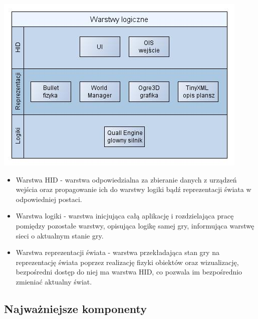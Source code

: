 \documentclass[12pt,a4paper,twoside]{article}
\begin{document}

\includegraphics{pics/LogicalViewClient.jpg}
\begin{itemize}
\item Warstwa HID - warstwa odpowiedzialna za zbieranie danych z urządzeń wejścia oraz propagowanie ich do warstwy logiki bądź reprezentacji świata w odpowiedniej postaci.
\item Warstwa logiki - warstwa inicjująca całą aplikację i rozdzielająca pracę pomiędzy pozostałe warstwy, opisująca logikę samej gry, informująca warstwę sieci o aktualnym stanie gry.
\item Warstwa reprezentacji świata - warstwa przekładająca stan gry na reprezentację świata poprzez realizację fizyki obiektów oraz wizualizację, bezpośredni dostęp do niej  ma warstwa HID, co pozwala im bezpośrednio zmieniać aktualny świat.
\end{itemize}


\subsection{Najważniejsze komponenty}
\end{document}
